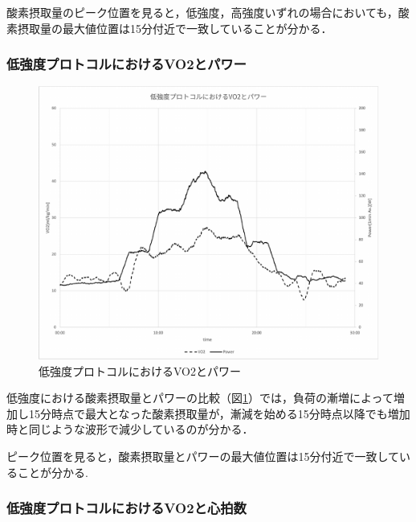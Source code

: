 酸素摂取量のピーク位置を見ると，低強度，高強度いずれの場合においても，酸素摂取量の最大値位置は15分付近で一致していることが分かる．

\subsubsection{低強度プロトコルにおけるVO2とパワー}

\begin{figure}[H]
  \begin{center}
    \includegraphics[width=12cm]{fig/light_vo2_power}
    \caption{低強度プロトコルにおけるVO2とパワー}
    \label{fig:light_vo2_power}
  \end{center}
\end{figure}

低強度における酸素摂取量とパワーの比較（図\ref{fig:light_vo2_power}）では，負荷の漸増によって増加し15分時点で最大となった酸素摂取量が，漸減を始める15分時点以降でも増加時と同じような波形で減少しているのが分かる．

ピーク位置を見ると，酸素摂取量とパワーの最大値位置は15分付近で一致していることが分かる.

\subsubsection{低強度プロトコルにおけるVO2と心拍数}

